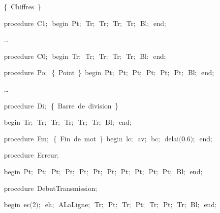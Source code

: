 {\vspace{\neglskip}\mbox{\blc  \blk\idt  \cmt  \{\ Chiffres\ \}\idt }\par 
\pagebreak[3] 
\vspace{\neglskip}\mbox{\blc  \blk\idt  \mcl procedure\idt \ C1$;$\ \mcl begin\idt \ Pt$;$\ Tr$;$\ Tr$;$\ Tr$;$\ Tr$;$\ Bl$;$\ \mcl end\idt $;$\ }\par 
\pagebreak[3] 
\vspace{\neglskip}\mbox{\blc  \blk\idt  \ldots}\par 
\pagebreak[3] 
\vspace{\neglskip}\mbox{\blc  \blk\idt  \mcl procedure\idt \ C0$;$\ \mcl begin\idt \ Tr$;$\ Tr$;$\ Tr$;$\ Tr$;$\ Tr$;$\ Bl$;$\ \mcl end\idt $;$}\par 
\medskip

\pagebreak[3] 
\vspace{\neglskip}\mbox{\blc  \blk\idt  \mcl procedure\idt \ Po$;$\ \cmt  \{\ Point\ \}\idt \ \mcl begin\idt \ Pt$;$\ Pt$;$\ Pt$;$\ Pt$;$\ Pt$;$\ Pt$;$\ Bl$;$\ \mcl end\idt $;$}\par 
\pagebreak[3] 
\vspace{\neglskip}\mbox{\blc  \blk\idt  \ldots}\par 
\vspace{\neglskip}\mbox{\blc  \blk\idt  \mcl procedure\idt \ Di$;$\ \cmt  \{\ Barre\ de\ division\ \}\idt \ }\par 
\vspace{\neglskip}\mbox{\blc  \blk\blk\idt  \mcl begin\idt \ Tr$;$\ Tr$;$\ Tr$;$\ Tr$;$\ Tr$;$\ Tr$;$\ Bl$;$\ \mcl end\idt $;$}\par 
\pagebreak[3] 
\vspace{\neglskip}\mbox{\blc  \blk\idt  \mcl procedure\idt \ Fm$;$\ \cmt  \{\ Fin\ de\ mot\ \}\idt \ \mcl begin\idt \ lc$;$\ av$;$\ bc$;$\ delai$($0$.$6$)$$;$\ \mcl end\idt $;$}\par 
\medskip

\pagebreak[3] 
\vspace{\neglskip}\mbox{\blc  \blk\idt  \mcl procedure\idt \ Erreur$;$}\par 
\vspace{\neglskip}\mbox{\blc  \blk\idt  \mcl begin\idt \ Pt$;$\ Pt$;$\ Pt$;$\ Pt$;$\ Pt$;$\ Pt$;$\ Pt$;$\ Pt$;$\ Pt$;$\ Pt$;$\ Pt$;$\ Bl$;$\ \mcl end\idt $;$}\par 
\medskip

\pagebreak[3] 
\vspace{\neglskip}\mbox{\blc  \blk\idt  \mcl procedure\idt \ DebutTransmission$;$}\par 
\vspace{\neglskip}\mbox{\blc  \blk\idt  \mcl begin\idt \ ec$($2$)$$;$\ eh$;$\ ALaLigne$;$\ Tr$;$\ Pt$;$\ Tr$;$\ Pt$;$\ Tr$;$\ Pt$;$\ Tr$;$\ Bl$;$\ \mcl end\idt $;$}\par 
\medskip

}
